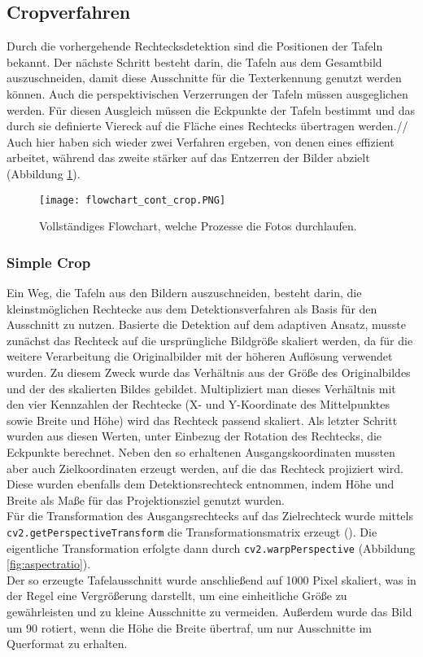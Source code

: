 \subsection{Cropverfahren}

Durch die vorhergehende Rechtecksdetektion sind die Positionen der Tafeln bekannt. Der nächste Schritt besteht darin, die Tafeln aus dem Gesamtbild auszuschneiden, damit diese Ausschnitte für die Texterkennung genutzt werden können. Auch die perspektivischen Verzerrungen der Tafeln müssen ausgeglichen werden. Für diesen Ausgleich müssen die Eckpunkte der Tafeln bestimmt und das durch sie definierte Viereck auf die Fläche eines Rechtecks übertragen werden.//
Auch hier haben sich wieder zwei Verfahren ergeben, von denen eines effizient arbeitet, während das zweite stärker auf das Entzerren der Bilder abzielt (Abbildung  \ref{fig:flowchartcrop}).
\begin{figure}[h!]
\centering
\texttt{[image: flowchart\_cont\_crop.PNG]}
\caption{Vollständiges Flowchart, welche Prozesse die Fotos durchlaufen.}
\label{fig:flowchartcrop}
\end{figure}

\subsubsection{Simple Crop}

Ein Weg, die Tafeln aus den Bildern auszuschneiden, besteht darin, die kleinstmöglichen Rechtecke aus dem Detektionsverfahren als Basis für den Ausschnitt zu nutzen. Basierte die Detektion auf dem adaptiven Ansatz, musste zunächst das Rechteck auf die ursprüngliche Bildgröße skaliert werden, da für die weitere Verarbeitung die Originalbilder mit der höheren Auflösung verwendet wurden. Zu diesem Zweck wurde das Verhältnis aus der Größe des Originalbildes und der des skalierten Bildes gebildet. Multipliziert man dieses Verhältnis mit den vier Kennzahlen der Rechtecke (X- und Y-Koordinate des Mittelpunktes sowie Breite und Höhe) wird das Rechteck passend skaliert. Als letzter Schritt wurden aus diesen Werten, unter Einbezug der Rotation des Rechtecks, die Eckpunkte berechnet.  Neben den so erhaltenen Ausgangskoordinaten mussten aber auch Zielkoordinaten erzeugt werden, auf die das Rechteck projiziert wird. Diese wurden ebenfalls dem Detektionsrechteck entnommen, indem Höhe und Breite als Maße für das Projektionsziel genutzt wurden.\\
Für die Transformation des Ausgangsrechtecks auf das Zielrechteck wurde mittels \verb|cv2.getPerspectiveTransform| die Transformationsmatrix erzeugt (\cite{cvtransform}). Die eigentliche Transformation erfolgte dann durch \verb|cv2.warpPerspective| (Abbildung  \ref{fig:aspectratio}).\\
Der so erzeugte Tafelausschnitt wurde anschließend auf 1000 Pixel skaliert, was in der Regel eine Vergrößerung darstellt, um eine einheitliche Größe zu gewährleisten und zu kleine Ausschnitte zu vermeiden. Außerdem wurde das Bild um 90 \degree rotiert, wenn die Höhe die Breite übertraf, um nur Ausschnitte im Querformat zu erhalten.

